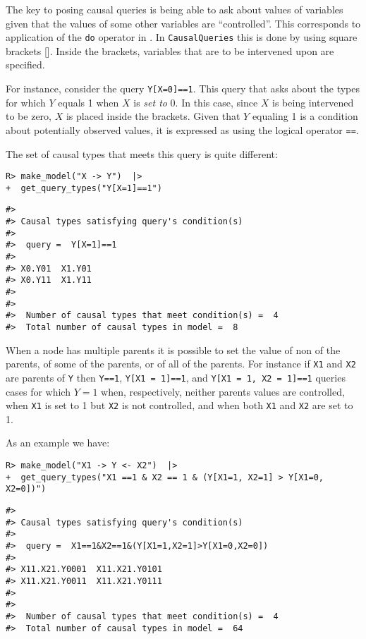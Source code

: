 \documentclass[
  11pt,
  article]{jss}
\begin{document}
The key to posing causal queries is being able to ask about values of
variables given that the values of some other variables are
``controlled''. This corresponds to application of the \texttt{do}
operator in \citet{pearl2009causality}. In \texttt{CausalQueries} this
is done by using square brackets {[}{]}. Inside the brackets, variables
that are to be intervened upon are specified.

For instance, consider the query \texttt{Y{[}X=0{]}==1}. This query that
asks about the types for which \(Y\) equals 1 when \(X\) is \emph{set
to} 0. In this case, since \(X\) is being intervened to be zero, \(X\)
is placed inside the brackets. Given that \(Y\) equaling 1 is a
condition about potentially observed values, it is expressed as using
the logical operator \texttt{==}.

The set of causal types that meets this query is quite different:

\begin{verbatim}
R> make_model("X -> Y")  |>
+  get_query_types("Y[X=1]==1")
\end{verbatim}

\begin{verbatim}
#> 
#> Causal types satisfying query's condition(s)  
#> 
#>  query =  Y[X=1]==1 
#> 
#> X0.Y01  X1.Y01
#> X0.Y11  X1.Y11
#> 
#> 
#>  Number of causal types that meet condition(s) =  4
#>  Total number of causal types in model =  8
\end{verbatim}

When a node has multiple parents it is possible to set the value of non
of the parents, of some of the parents, or of all of the parents. For
instance if \texttt{X1} and \texttt{X2} are parents of \texttt{Y} then
\texttt{Y==1}, \texttt{Y{[}X1\ =\ 1{]}==1}, and
\texttt{Y{[}X1\ =\ 1,\ X2\ =\ 1{]}==1} queries cases for which \(Y=1\)
when, respectively, neither parents values are controlled, when
\texttt{X1} is set to 1 but \texttt{X2} is not controlled, and when both
\texttt{X1} and \texttt{X2} are set to 1.

As an example we have:

\begin{verbatim}
R> make_model("X1 -> Y <- X2")  |>
+  get_query_types("X1 ==1 & X2 == 1 & (Y[X1=1, X2=1] > Y[X1=0, X2=0])")
\end{verbatim}

\begin{verbatim}
#> 
#> Causal types satisfying query's condition(s)  
#> 
#>  query =  X1==1&X2==1&(Y[X1=1,X2=1]>Y[X1=0,X2=0]) 
#> 
#> X11.X21.Y0001  X11.X21.Y0101
#> X11.X21.Y0011  X11.X21.Y0111
#> 
#> 
#>  Number of causal types that meet condition(s) =  4
#>  Total number of causal types in model =  64
\end{verbatim}
\end{document}
